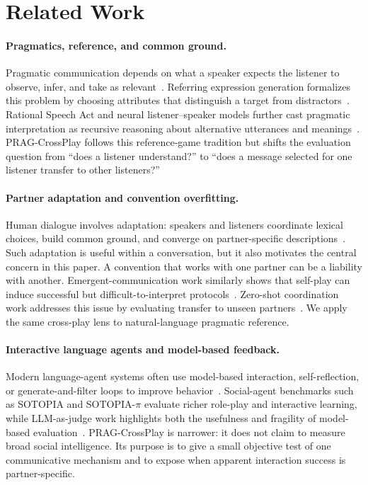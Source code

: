 \documentclass{article}
\begin{document}
\section{Related Work}

\paragraph{Pragmatics, reference, and common ground.}
Pragmatic communication depends on what a speaker expects the listener to observe, infer, and take as relevant~\cite{grice1975logic,clark1996using}. Referring expression generation formalizes this problem by choosing attributes that distinguish a target from distractors~\cite{dale1995computational}. Rational Speech Act and neural listener--speaker models further cast pragmatic interpretation as recursive reasoning about alternative utterances and meanings~\cite{frank2012predicting,goodman2016pragmatic,andreas2016reasoning,monroe2017colors,cohngordon2018pragmatically}. PRAG-CrossPlay follows this reference-game tradition but shifts the evaluation question from ``does a listener understand?'' to ``does a message selected for one listener transfer to other listeners?''

\paragraph{Partner adaptation and convention overfitting.}
Human dialogue involves adaptation: speakers and listeners coordinate lexical choices, build common ground, and converge on partner-specific descriptions~\cite{clark1986referring,brennan1996conceptual,pickering2004toward}. Such adaptation is useful within a conversation, but it also motivates the central concern in this paper. A convention that works with one partner can be a liability with another. Emergent-communication work similarly shows that self-play can induce successful but difficult-to-interpret protocols~\cite{foerster2016learning,lazaridou2017multiagent,havrylov2017emergence,lowe2019pitfalls}. Zero-shot coordination work addresses this issue by evaluating transfer to unseen partners~\cite{carroll2019utility,hu2020otherplay,lucas2022anyplay}. We apply the same cross-play lens to natural-language pragmatic reference.

\paragraph{Interactive language agents and model-based feedback.}
Modern language-agent systems often use model-based interaction, self-reflection, or generate-and-filter loops to improve behavior~\cite{yao2023react,madaan2023selfrefine,shinn2023reflexion}. Social-agent benchmarks such as SOTOPIA and SOTOPIA-$\pi$ evaluate richer role-play and interactive learning, while LLM-as-judge work highlights both the usefulness and fragility of model-based evaluation~\cite{zhou2023sotopia,wang2024sotopiapi,zheng2023judging}. PRAG-CrossPlay is narrower: it does not claim to measure broad social intelligence. Its purpose is to give a small objective test of one communicative mechanism and to expose when apparent interaction success is partner-specific.
\end{document}
